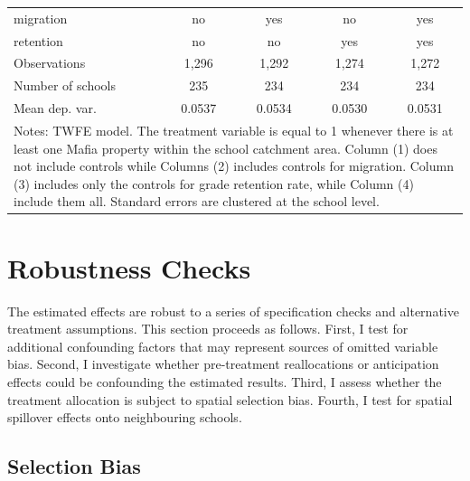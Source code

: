 \documentclass[12pt]{article}
\theoremstyle{plain}
\theoremstyle{plain}
\theoremstyle{plain}
\theoremstyle{definition}
\theoremstyle{plain}
\theoremstyle{definition}
\theoremstyle{plain}
\theoremstyle{remark}
\theoremstyle{definition}
\theoremstyle{definition}
\theoremstyle{plain}
\begin{document}
\begin{table}[H]
{\begin{tabular}{p{7.39em}llll}
			\multicolumn{1}{l}{migration} & \multicolumn{1}{c}{no} & \multicolumn{1}{c}{yes} & \multicolumn{1}{c}{no} & \multicolumn{1}{c}{yes} \\
			\multicolumn{1}{l}{retention} & \multicolumn{1}{c}{no} & \multicolumn{1}{c}{no} & \multicolumn{1}{c}{yes} & \multicolumn{1}{c}{yes} \\
			\multicolumn{1}{l}{Observations} & \multicolumn{1}{c}{1,296} & \multicolumn{1}{c}{1,292} & \multicolumn{1}{c}{1,274} & \multicolumn{1}{c}{1,272} \\
			\multicolumn{1}{l}{Number of schools} & \multicolumn{1}{c}{235} & \multicolumn{1}{c}{234} & \multicolumn{1}{c}{234} & \multicolumn{1}{c}{234} \\
			\multicolumn{1}{l}{Mean dep. var.} & \multicolumn{1}{c}{0.0537} & \multicolumn{1}{c}{0.0534} & \multicolumn{1}{c}{0.0530} & \multicolumn{1}{c}{0.0531} \\
			\midrule
			\multicolumn{5}{p{37.61em}}{Notes: TWFE model. The treatment variable is equal to 1 whenever there is at least one Mafia property within the school catchment area. Column (1) does not include controls while Columns (2) includes controls for migration. Column (3) includes only the controls for grade retention rate, while Column (4) include them all. Standard errors are clustered at the school level.} \\
		\end{tabular}%
	}
\end{table}



\FloatBarrier
\section{Robustness Checks}
\label{sec:jmp_robustness}
The estimated effects are robust to a series of specification checks and alternative treatment assumptions. This section proceeds as follows. First, I test for additional confounding factors that may represent sources of omitted variable bias. Second, I investigate whether pre-treatment reallocations or anticipation effects could be confounding the estimated results. Third, I assess whether the treatment allocation is subject to spatial selection bias. Fourth, I test for spatial spillover effects onto neighbouring schools. \par 
\medskip
\FloatBarrier
\subsection{Selection Bias}
\label{sec:jmp_ovb}
\end{document}
